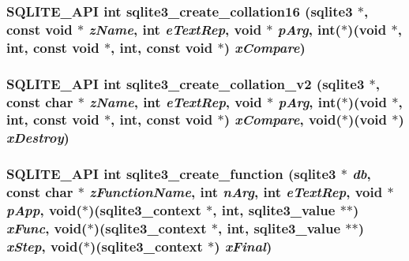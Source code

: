 \subsubsection{\setlength{\rightskip}{0pt plus 5cm}SQLITE\_\-API int sqlite3\_\-create\_\-collation16 (\bf{sqlite3} $\ast$, const void $\ast$ {\em z\-Name}, int {\em e\-Text\-Rep}, void $\ast$ {\em p\-Arg}, int($\ast$)(void $\ast$, int, const void $\ast$, int, const void $\ast$) {\em x\-Compare})}\label{sqlite3_8h_525239b46e0f69f7c3a2a28a35d3ff20}


\subsubsection{\setlength{\rightskip}{0pt plus 5cm}SQLITE\_\-API int sqlite3\_\-create\_\-collation\_\-v2 (\bf{sqlite3} $\ast$, const char $\ast$ {\em z\-Name}, int {\em e\-Text\-Rep}, void $\ast$ {\em p\-Arg}, int($\ast$)(void $\ast$, int, const void $\ast$, int, const void $\ast$) {\em x\-Compare}, void($\ast$)(void $\ast$) {\em x\-Destroy})}\label{sqlite3_8h_2cd7da719748dbeb98b73444ed62c9cf}


\subsubsection{\setlength{\rightskip}{0pt plus 5cm}SQLITE\_\-API int sqlite3\_\-create\_\-function (\bf{sqlite3} $\ast$ {\em db}, const char $\ast$ {\em z\-Function\-Name}, int {\em n\-Arg}, int {\em e\-Text\-Rep}, void $\ast$ {\em p\-App}, void($\ast$)(\bf{sqlite3\_\-context} $\ast$, int, \bf{sqlite3\_\-value} $\ast$$\ast$) {\em x\-Func}, void($\ast$)(\bf{sqlite3\_\-context} $\ast$, int, \bf{sqlite3\_\-value} $\ast$$\ast$) {\em x\-Step}, void($\ast$)(\bf{sqlite3\_\-context} $\ast$) {\em x\-Final})}\label{sqlite3_8h_f070a60371f4332d24e7be7b7f2097b7}


